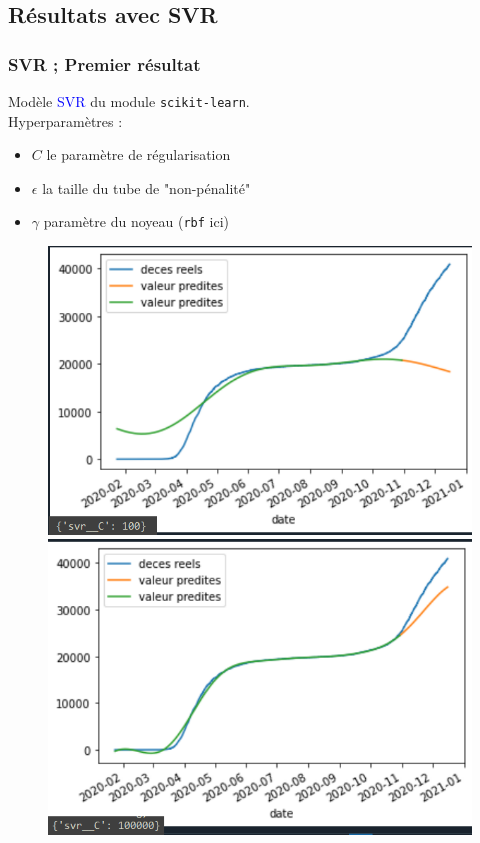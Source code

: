 \documentclass{beamer}
\begin{document}
\subsection{Résultats avec SVR}
\begin{frame}
	\frametitle{SVR ; Premier résultat}
	Modèle \textcolor{blue}{SVR} du module \texttt{scikit-learn}.\\
	Hyperparamètres :
	\begin{itemize}
		\item[]$C$ le paramètre de régularisation
		\item[]$\epsilon$ la taille du tube de "non-pénalité"
		\item[]$\gamma$ paramètre du noyeau (\texttt{rbf} ici)
	\end{itemize}
	\begin{figure}[h]
		\centering
		\begin{minipage}{0.5\textwidth}
			\includegraphics[scale=0.37]{svr100}
		\end{minipage}%
		\begin{minipage}{0.5\textwidth}
			\includegraphics[scale=0.37]{svr100000}

\end{minipage}
\end{figure}
\end{frame}
\end{document}
